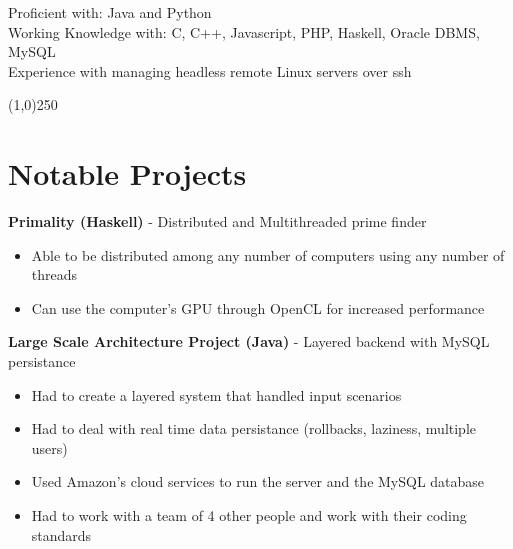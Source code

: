 \documentclass[margin,line, 11pt]{resume}
\begin{document}
\begin{resume}
    Proficient with: Java and Python							\vspace{2mm}\\						
    Working Knowledge with: C, C++, Javascript, PHP, Haskell, Oracle DBMS, MySQL					\vspace{2mm}\\
    Experience with managing headless remote Linux servers over ssh
    
    \vspace{-5mm}
    \line(1,0){250}
    
    
    \section{\mysidestyle \textbf {Notable Projects}}
    
    \vspace{0mm}

     \textbf{Primality (Haskell)} - Distributed and Multithreaded prime finder
     \begin{itemize}
      \item Able to be distributed among any number of computers using any number of threads
      \item Can use the computer's GPU through OpenCL for increased performance
     \end{itemize}

     \textbf{Large Scale Architecture Project (Java)} - Layered backend with MySQL persistance
     \begin{itemize}
      \item Had to create a layered system that handled input scenarios
      \item Had to deal with real time data persistance (rollbacks, laziness, multiple users)
      \item Used Amazon's cloud services to run the server and the MySQL database
      \item Had to work with a team of 4 other people and work with their coding standards
     \end{itemize}
% 


\end{resume}
\end{document}
